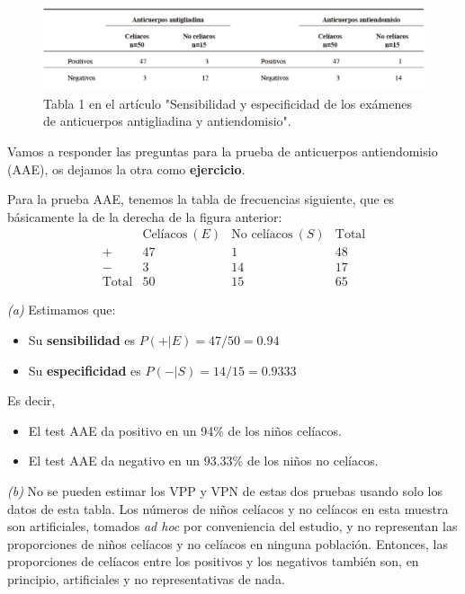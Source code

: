 \documentclass[
]{book}
\providecommand{\tightlist}{%
  \setlength{\itemsep}{0pt}\setlength{\parskip}{0pt}}
\theoremstyle{definition}
\theoremstyle{definition}
\theoremstyle{definition}
\theoremstyle{definition}
\theoremstyle{remark}
\begin{document}
\begin{figure}

{\centering \includegraphics[width=0.9\linewidth]{INREMDN_files/figure-html/espe2} 

}

\caption{Tabla 1 en el artículo "Sensibilidad y especificidad de los exámenes de anticuerpos antigliadina y antiendomisio".}\label{fig:espe2}
\end{figure}

Vamos a responder las preguntas para la prueba de anticuerpos antiendomisio (AAE), os dejamos la otra como \textbf{ejercicio}.

Para la prueba AAE, tenemos la tabla de frecuencias siguiente, que es básicamente la de la derecha de la figura anterior:
\[
\begin{array}{r|cc|c}
& \text{Celíacos}\ (E) & \text{No celíacos}\ (S) & \text{Total} \\ \hline
+ & 47 & 1 & 48  \\  
- & 3 & 14 & 17 \\ \hline
\text{Total} & 50  & 15 & 65  
\end{array}
\]

\emph{(a)} Estimamos que:

\begin{itemize}
\item
  Su \textbf{sensibilidad} es \(P(+|E)=47/50=0.94\)
\item
  Su \textbf{especificidad} es \(P(-|S)= 14/15=0.9333\)
\end{itemize}

Es decir,

\begin{itemize}
\tightlist
\item
  El test AAE da positivo en un 94\% de los niños celíacos.
\item
  El test AAE da negativo en un 93.33\% de los niños no celíacos.
\end{itemize}

\emph{(b)} No se pueden estimar los VPP y VPN de estas dos pruebas usando solo los datos de esta tabla. Los números de niños celíacos y no celíacos en esta muestra son artificiales, tomados \emph{ad hoc} por conveniencia del estudio, y no representan las proporciones de niños celíacos y no celíacos en ninguna población. Entonces, las proporciones de celíacos entre los positivos y los negativos también son, en principio, artificiales y no representativas de nada.
\end{document}
